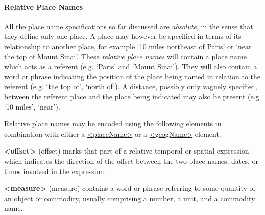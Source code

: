 \paragraph[{Relative Place Names}]{Relative Place Names}\label{NDPLR}\par
All the place name specifications so far discussed are \textit{absolute}, in the sense that they define only one place. A place may however be specified in terms of its relationship to another place, for example ‘10 miles northeast of Paris’ or ‘near the top of Mount Sinai’. These \textit{relative place names} will contain a place name which acts as a referent (e.g. ‘Paris’ and ‘Mount Sinai’). They will also contain a word or phrase indicating the position of the place being named in relation to the referent (e.g. ‘the top of’, ‘north of’). A distance, possibly only vaguely specified, between the referent place and the place being indicated may also be present (e.g. ‘10 miles’, ‘near’).\par
Relative place names may be encoded using the following elements in combination with either a \hyperref[TEI.placeName]{<placeName>} or a \hyperref[TEI.geogName]{<geogName>} element. 
\begin{sansreflist}
  
\item [\textbf{<offset>}] (offset) marks that part of a relative temporal or spatial expression which indicates the direction of the offset between the two place names, dates, or times involved in the expression.
\item [\textbf{<measure>}] (measure) contains a word or phrase referring to some quantity of an object or commodity, usually comprising a number, a unit, and a commodity name.
\end{sansreflist}
